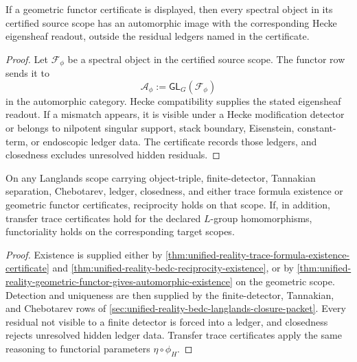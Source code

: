 \begin{theorem}
\label{thm:unified-reality-geometric-functor-gives-automorphic-existence}
If a geometric functor certificate is displayed, then every spectral
object in its certified source scope has an automorphic image with the
corresponding Hecke eigensheaf readout, outside the residual ledgers
named in the certificate.
\end{theorem}
\begin{proof}
Let $\mathcal F_{\phi}$ be a spectral object in the certified source
scope. The functor row sends it to
$$
\mathcal A_{\phi}:=\mathsf{GL}_G(\mathcal F_{\phi})
$$
in the automorphic category. Hecke compatibility supplies the stated
eigensheaf readout. If a mismatch appears, it is visible under a Hecke
modification detector or belongs to nilpotent singular support, stack
boundary, Eisenstein, constant-term, or endoscopic ledger data. The
certificate records those ledgers, and closedness excludes unresolved
hidden residuals.
\end{proof}

\begin{theorem}
\label{thm:unified-reality-langlands-existence-and-closure-principle}
On any Langlands scope carrying object-triple, finite-detector,
Tannakian separation, Chebotarev, ledger, closedness, and either trace
formula existence or geometric functor certificates, reciprocity holds on
that scope. If, in addition, transfer trace certificates hold for the
declared $L$-group homomorphisms, functoriality holds on the
corresponding target scopes.
\end{theorem}
\begin{proof}
Existence is supplied either by
\autoref{thm:unified-reality-trace-formula-existence-certificate} and
\autoref{thm:unified-reality-bedc-reciprocity-existence}, or by
\autoref{thm:unified-reality-geometric-functor-gives-automorphic-existence}
on the geometric scope. Detection and uniqueness are then supplied by
the finite-detector, Tannakian, and Chebotarev rows of
\autoref{sec:unified-reality-bedc-langlands-closure-packet}. Every
residual not visible to a finite detector is forced into a ledger, and
closedness rejects unresolved hidden ledger data. Transfer trace
certificates apply the same reasoning to functorial parameters
$\eta\circ\phi_H$.
\end{proof}

